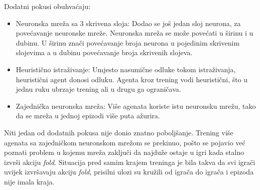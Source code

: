 Dodatni pokusi obuhvaćaju:
\begin{itemize}
	\item Neuronska mreža sa 3 skrivena sloja: Dodao se još jedan sloj neurona, za povećavanje neuronske mreže. Neuronska mreža se može povećati u širinu i u dubinu. U širinu znači povećavanje broja neurona u pojedinim skrivenim slojevima a u dubinu povećavanje broja skrivenih slojeva.
	\item Heuristično istraživanje: Umjesto nasumične odluke tokom istraživanja, heuristični agent donosi odluku. Agenta kroz trening vodi heuristični, što u jednu ruku ubrzaje trening ali u drugu ga ograničava.
	\item Zajednička neuronska mreža: Više agenata koriste istu neuronsku mrežu, tako da se mreža u jednoj epizodi više puta ažurira. 
\end{itemize}

Niti jedan od dodatnih pokusa nije donio znatno poboljšanje. Trening više agenata sa zajedničkom neuronskom mrežom se prekinuo, pošto se pojavio već poznati problem u kojemu mreža zaključi da najduže ostaje u igri kada stalno izvrši akciju \textit{fold}. Situacija pred samim krajem treninga je bila takva da svi igrači uvijek izvršavaju akciju \textit{fold}, prisilni ulozi su kružili od igrača do igrača i epizoda nije imala kraja.
